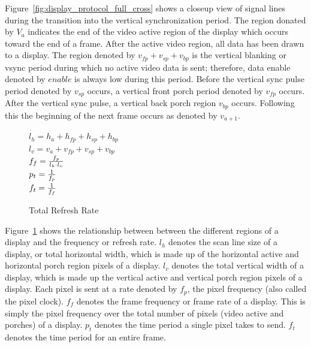     Figure~\ref{fig:display_protocol_full_cross} shows a closeup view of signal lines during the transition into the vertical synchronization period. The region donated by $V_a$ indicates the end of the video active region of the display which occurs toward the end of a frame. After the active video region, all data has been drawn to a display. The region denoted by $v_{fp}+v_{sp}+v_{bp}$ is the vertical blanking or vsync period during which no active video data is sent; therefore, data enable denoted by $enable$ is always low during this period. Before the vertical sync pulse period denoted by $v_{sp}$ occurs, a vertical front porch period denoted by $v_{fp}$ occurs. After the vertical sync pulse, a vertical back porch region $v_{bp}$ occurs. Following this the beginning of the next frame occurs as denoted by $v_{a+1}$.
    \begin{figure}
        \centering
        { \Large
            $l_h=h_a+h_{fp}+h_{sp}+h_{bp}$ \vspace{8px} \\
            $l_v=v_a+v_{fp}+v_{sp}+v_{bp}$ \vspace{8px} \\
            $f_f={f_p \over {l_h \cdot l_v}}$ \\
            $p_t={1 \over f_p}$ \vspace{8px} \\
            $f_t={1 \over f_f}$ \vspace{8px}
        }
        \caption{Total Refresh Rate}
        \label{fig:modeline_refresh_rate}
    \end{figure}

    Figure~\ref{fig:modeline_refresh_rate} shows the relationship between between the different regions of a display and the frequency or refresh rate. $l_h$ denotes the scan line size of a display, or total horizontal width, which is made up of the horizontal active and horizontal porch region pixels of a display. $l_v$ denotes the total vertical width of a display, which is made up the vertical active and vertical porch region pixels of a display. Each pixel is sent at a rate denoted by $f_p$, the pixel frequency (also called the pixel clock). $f_f$ denotes the frame frequency or frame rate of a display. This is simply the pixel frequency over the total number of pixels (video active and porches) of a display. $p_t$ denotes the time period a single pixel takes to send. $f_t$ denotes the time period for an entire frame.

